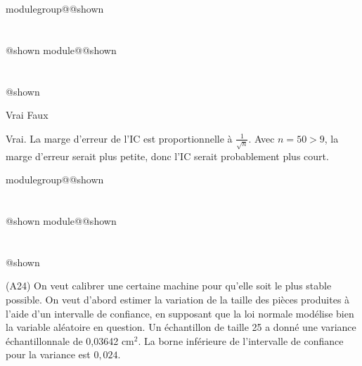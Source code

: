 \documentclass{Evaluation}
\makeatletter
\newcommand{\currentmodulekey}{}
\newcommand{\currentmoduletitle}{}
\newcommand{\currentgroupkey}{}
\newcommand{\currentgrouptitle}{}
\newcommand{\showmoduleifneeded}{%
  \ifx\currentgroupkey\empty\else
    \expandafter\ifx\csname modulegroup@\currentgroupkey @shown\endcsname\relax
      \section*{\currentgrouptitle}%
      \expandafter\gdef\csname modulegroup@\currentgroupkey @shown\endcsname{1}%
    \fi
  \fi
  \expandafter\ifx\csname module@\currentmodulekey @shown\endcsname\relax
    \section*{\currentmoduletitle}%
    \expandafter\gdef\csname module@\currentmodulekey @shown\endcsname{1}%
  \fi
}
\newenvironment{A24}{\showmoduleifneeded}{}
\makeatother
\begin{document}
\begin{questions}
\begin{A24}
\begin{parts}
    \begin{oneparcheckboxes}
        \correctchoice Vrai
        \choice Faux
    \end{oneparcheckboxes}
    \begin{solution}
    Vrai. La marge d'erreur de l'IC est proportionnelle à $\frac{1}{\sqrt{n}}$. Avec $n = 50 > 9$, la marge d'erreur serait plus petite, donc l'IC serait probablement plus court.
    \end{solution}
    
\end{parts}
\end{A24}

\begin{A24}
\question (A24) On veut calibrer une certaine machine pour qu'elle soit le plus stable possible.
On veut d’abord estimer la variation de la taille des pièces produites à l'aide d'un intervalle de confiance, en supposant que la loi normale modélise bien la variable aléatoire en question.
Un échantillon de taille 25 a donné une variance échantillonnale de 0,03642 cm$^2$.
La borne inférieure de l'intervalle de confiance pour la variance est $0,024$.

\end{A24}
\end{questions}
\end{document}
